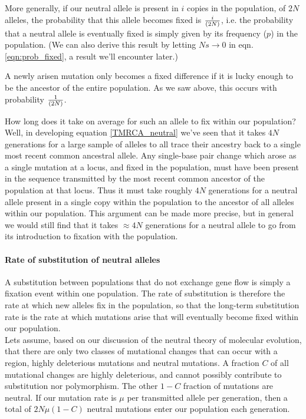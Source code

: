 More generally, if our neutral allele is present in $i$ copies in the
population, of $2N$ alleles, the probability that this allele becomes fixed is
$\nicefrac{i}{(2N)}$, i.e. the probability that a neutral allele is eventually
fixed is simply given by its frequency ($p$) in the population.  (We can also
derive this result by letting $Ns \rightarrow 0$ in eqn.
\eqref{eqn:prob_fixed}, a result we'll encounter later.)




A newly arisen mutation only becomes a fixed difference if it is lucky
enough to be the ancestor of the entire population. As we saw above, this occurs
with probability $\nicefrac{1}{(2N)}$. 

How long does it take on average for
such an allele to fix within our population? Well, in developing
equation \eqref{TMRCA_neutral} we've seen that it takes $4N$
generations for a large sample of alleles to all trace their ancestry back to a
single most recent common ancestral allele. Any single-base pair change which arose as a single mutation at a locus, and fixed in the population, must have been present in the sequence transmitted by the most recent common ancestor of the population at that locus. Thus it must take roughly $4N$ generations
for a neutral allele present in a single copy within the population to the
ancestor of all alleles within our population.  This argument can be made more
precise, but in general we would still find that it takes $\approx 4N$
generations for a neutral allele to go from its introduction to fixation with
the population.   \\

\paragraph{Rate of substitution of neutral alleles}

A substitution between populations that do not exchange gene flow is simply a
fixation event within one population. The rate of substitution is therefore the
rate at which new alleles fix in the population, so that the long-term
substitution rate is the rate at which mutations arise that will eventually
become fixed within our population.\\

Lets assume, based on our discussion of the neutral theory of molecular evolution, that there are only two classes of mutational changes that can occur with a
region, highly deleterious mutations and neutral mutations. A fraction $C$ of
all mutational changes are highly deleterious, and cannot possibly contribute
to substitution nor polymorphism.  The other $1-C$ fraction
of mutations are neutral. If our mutation rate is $\mu$ per transmitted allele
per generation, then a total of $2N \mu (1-C)$ neutral mutations enter our
population each generation.\\

